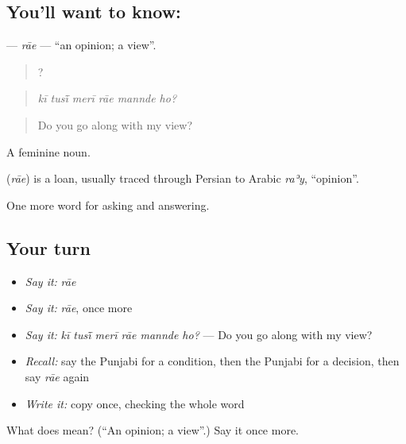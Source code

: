 \subsection*{You'll want to know: }
\textbf{} — \emph{rāe} — \textquotedblleft{}an opinion; a view\textquotedblright{}.

\begin{quote}
     ?
\end{quote}

\begin{quote}
\emph{kī tusī̃ merī rāe mannde ho?}
\end{quote}

\begin{quote}
Do you go along with my view?
\end{quote}

A feminine noun.

\begin{cousinweb}
\textbf{} (\emph{rāe}) is a loan, usually traced through Persian to Arabic \emph{raʾy}, \textquotedblleft{}opinion\textquotedblright{}.
\end{cousinweb}

\begin{grammarlens}[title={What you've built}]
One more word for asking and answering.
\end{grammarlens}

\subsection*{Your turn}
\begin{itemize}
\raggedright
  \item \emph{Say it:} \emph{rāe}
  \item \emph{Say it:} \emph{rāe}, once more
  \item \emph{Say it:} \emph{kī tusī̃ merī rāe mannde ho?} — Do you go along with my view?
  \item \emph{Recall:} say the Punjabi for a condition, then the Punjabi for a decision, then say \emph{rāe} again
  \item \emph{Write it:} copy \textbf{} once, checking the whole word
\end{itemize}

\begin{tcolorbox}[breakable,colback=teal!4,colframe=teal!35!black,title={Before you move on}]
What does  mean? (\textquotedblleft{}An opinion; a view\textquotedblright{}.) Say it once more.
\end{tcolorbox}

